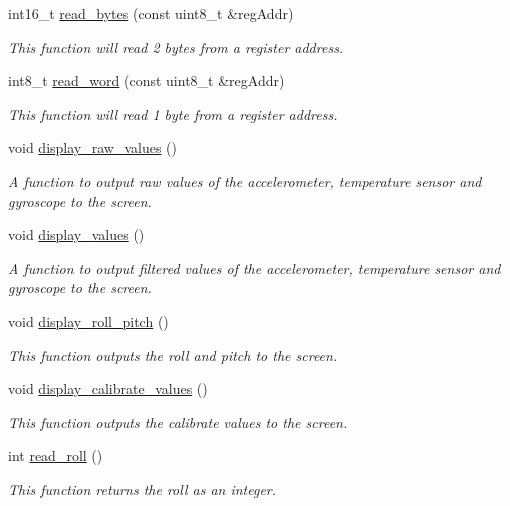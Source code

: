 \begin{DoxyCompactItemize}
int16\+\_\+t \mbox{\hyperlink{classi2c__mpu6050_ade55e40b4285d8a2212e88175e8b0b10}{read\+\_\+bytes}} (const uint8\+\_\+t \&reg\+Addr)
\begin{DoxyCompactList}\small\item\em This function will read 2 bytes from a register address. \end{DoxyCompactList}\item 
int8\+\_\+t \mbox{\hyperlink{classi2c__mpu6050_a54a1577831ede549ff05b96403d8ad62}{read\+\_\+word}} (const uint8\+\_\+t \&reg\+Addr)
\begin{DoxyCompactList}\small\item\em This function will read 1 byte from a register address. \end{DoxyCompactList}\item 
void \mbox{\hyperlink{classi2c__mpu6050_a24a1e7c044411670d724d1c3e411eea5}{display\+\_\+raw\+\_\+values}} ()
\begin{DoxyCompactList}\small\item\em A function to output raw values of the accelerometer, temperature sensor and gyroscope to the screen. \end{DoxyCompactList}\item 
void \mbox{\hyperlink{classi2c__mpu6050_ac5035930b0bc113e67c2838e17ae1460}{display\+\_\+values}} ()
\begin{DoxyCompactList}\small\item\em A function to output filtered values of the accelerometer, temperature sensor and gyroscope to the screen. \end{DoxyCompactList}\item 
void \mbox{\hyperlink{classi2c__mpu6050_ab416fccb252bc742b84416ae78e48f58}{display\+\_\+roll\+\_\+pitch}} ()
\begin{DoxyCompactList}\small\item\em This function outputs the roll and pitch to the screen. \end{DoxyCompactList}\item 
void \mbox{\hyperlink{classi2c__mpu6050_a6da4020009994ec37d4388ede0284074}{display\+\_\+calibrate\+\_\+values}} ()
\begin{DoxyCompactList}\small\item\em This function outputs the calibrate values to the screen. \end{DoxyCompactList}\item 
int \mbox{\hyperlink{classi2c__mpu6050_a0ebe5455574a34f7c0355c96f9c30e9c}{read\+\_\+roll}} ()
\begin{DoxyCompactList}\small\item\em This function returns the roll as an integer. \end{DoxyCompactList}\item 

\end{DoxyCompactItemize}
